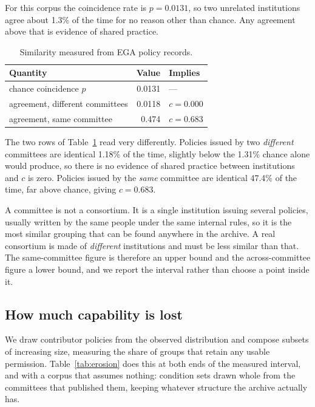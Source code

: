 \documentclass[sigconf,anonymous,review]{acmart}
\begin{document}
For this corpus the coincidence rate is $p = 0.0131$, so two unrelated
institutions agree about 1.3\% of the time for no reason other than chance. Any
agreement above that is evidence of shared practice.

\begin{table}[h]
\caption{Similarity measured from EGA policy records.}
\label{tab:cohesion}
\begin{tabular}{lrl}
\toprule
Quantity & Value & Implies \\
\midrule
chance coincidence $p$ & 0.0131 & --- \\
agreement, different committees & 0.0118 & $c=0.000$ \\
agreement, same committee & 0.474 & $c=0.683$ \\
\bottomrule
\end{tabular}
\end{table}

The two rows of Table~\ref{tab:cohesion} read very differently. Policies issued by
two \emph{different} committees are identical 1.18\% of the time, slightly below
the 1.31\% chance alone would produce, so there is no evidence of shared practice
between institutions and $c$ is zero. Policies issued by the \emph{same} committee
are identical 47.4\% of the time, far above chance, giving $c = 0.683$.

A committee is not a consortium. It is a single institution issuing several
policies, usually written by the same people under the same internal rules, so it
is the most similar grouping that can be found anywhere in the archive. A real
consortium is made of \emph{different} institutions and must be less similar than
that. The same-committee figure is therefore an upper bound and the
across-committee figure a lower bound, and we report the interval rather than
choose a point inside it.

\subsection{How much capability is lost}

We draw contributor policies from the observed distribution and compose subsets of
increasing size, measuring the share of groups that retain any usable permission.
Table~\ref{tab:erosion} does this at both ends of the measured interval, and with
a corpus that assumes nothing: condition sets drawn whole from the committees that
published them, keeping whatever structure the archive actually has.
\end{document}
